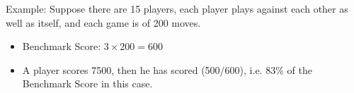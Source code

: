 \documentclass{icldt}
\numberwithin{equation}{section}       %
\begin{document}
Example:
Suppose there are 15 players, each player plays against each other as well as itself, and each game is of 200 moves.
\begin{itemize}
\item Benchmark Score: \(3\times 200 = 600\)
\item A player scores 7500, then he has scored (500/600), i.e. 83\% of the Benchmark Score in this case.
\end{itemize}


\nocite{*}
\end{document}
